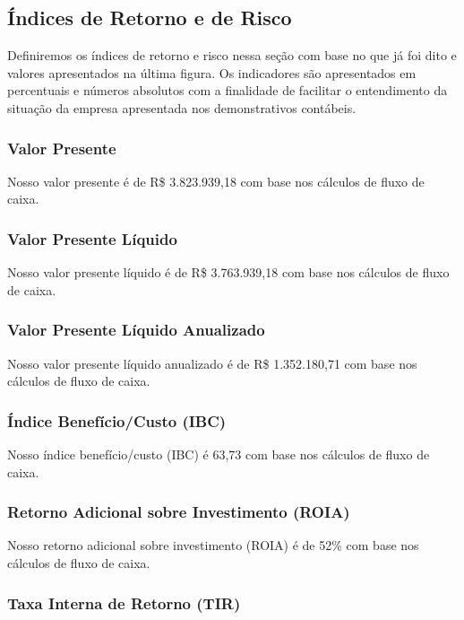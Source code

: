 \documentclass[onecolumn,12pt]{asme2ej}
\begin{document}
\subsection{Índices de Retorno e de Risco}

Definiremos os índices de retorno e risco nessa seção com base no que já foi dito e valores apresentados na última figura. Os indicadores são apresentados em percentuais e números absolutos com a finalidade de facilitar o entendimento da situação da empresa apresentada nos demonstrativos contábeis.

\subsubsection{Valor Presente}

Nosso valor presente é de R\$ 3.823.939,18 com base nos cálculos de fluxo de caixa.

\subsubsection{Valor Presente Líquido}

Nosso valor presente líquido é de R\$ 3.763.939,18 com base nos cálculos de fluxo de caixa.

\subsubsection{Valor Presente Líquido Anualizado}

Nosso valor presente líquido anualizado é de R\$ 1.352.180,71 com base nos cálculos de fluxo de caixa.

\subsubsection{Índice Benefício/Custo (IBC)}

Nosso índice benefício/custo (IBC) é 63,73 com base nos cálculos de fluxo de caixa.

\subsubsection{Retorno Adicional sobre Investimento (ROIA)}

Nosso retorno adicional sobre investimento (ROIA) é de 52\% com base nos cálculos de fluxo de caixa. 

\subsubsection{Taxa Interna de Retorno (TIR)}
\end{document}
